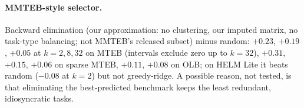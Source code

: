 \documentclass{article}
\begin{document}
\paragraph{MMTEB-style selector.} Backward elimination (our approximation: no clustering, our imputed matrix, no task-type balancing; not MMTEB's released subset) minus random: $+0.23$, $+0.19$, $+0.05$ at $k=2,8,32$ on MTEB (intervals exclude zero up to $k=32$), $+0.31$, $+0.15$, $+0.06$ on sparse MTEB, $+0.11$, $+0.08$ on OLB; on HELM Lite it beats random ($-0.08$ at $k=2$) but not greedy-ridge. A possible reason, not tested, is that eliminating the best-predicted benchmark keeps the least redundant, idiosyncratic tasks.
\end{document}
